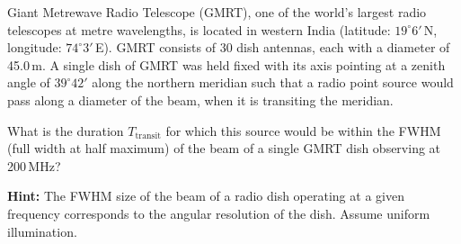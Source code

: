 Giant Metrewave Radio Telescope (GMRT), one of the world's largest radio
telescopes at metre wavelengths, is located in western India (latitude:
$19^\circ 6'$\,N, longitude: $74^\circ 3'$\,E). GMRT consists of 30 dish
antennas, each with a diameter of 45.0\,m. A single dish of GMRT was held fixed
with its axis pointing at a zenith angle of $39^\circ 42'$ along the northern
meridian such that a radio point source would pass along a diameter of the
beam, when it is transiting the meridian.

What is the duration $T_{\mathrm{transit}}$ for which this source would be
within the FWHM (full width at half maximum) of the beam of a single GMRT dish
observing at 200\,MHz?

\textbf{Hint:} The FWHM size of the beam of a radio dish operating at a given
frequency corresponds to the angular resolution of the dish. Assume uniform
illumination.
